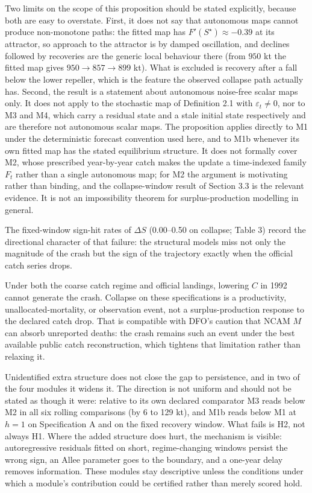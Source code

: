\documentclass[11pt]{article}
\begin{document}
Two limits on the scope of this proposition should be stated
explicitly, because both are easy to overstate. First, it does not say
that autonomous maps cannot produce non-monotone paths: the fitted map
has \(F'(S^\star) \approx -0.39\) at its attractor, so approach to the
attractor is by damped oscillation, and declines followed by recoveries
are the generic local behaviour there (from \(950\) kt the fitted map
gives \(950 \to 857 \to 899\) kt). What is excluded is recovery after a
fall below the lower repeller, which is the feature the observed
collapse path actually has. Second, the result is a statement about
autonomous noise-free scalar maps only. It does not apply to the
stochastic map of Definition 2.1 with \(\varepsilon_t \neq 0\), nor to
M3 and M4, which carry a residual state and a stale initial state
respectively and are therefore not autonomous scalar maps. The
proposition applies directly to M1 under the deterministic forecast
convention used here, and to M1b whenever its own fitted map has the
stated equilibrium structure. It does not formally cover M2, whose
prescribed year-by-year catch makes the update a time-indexed family
\(F_t\) rather than a single autonomous map; for M2 the argument is
motivating rather than binding, and the collapse-window result of
Section 3.3 is the relevant evidence. It is not an impossibility
theorem for surplus-production modelling in general.

The fixed-window sign-hit rates of \(\Delta S\) (0.00--0.50 on collapse;
Table 3) record the directional character of that failure: the
structural models miss not only the magnitude of the crash but the sign
of the trajectory exactly when the official catch series drops.

Under both the coarse catch regime and official landings, lowering \(C\)
in 1992 cannot generate the crash. Collapse on these specifications is a
productivity, unallocated-mortality, or observation event, not a
surplus-production response to the declared catch drop. That is
compatible with DFO's caution that NCAM \(M\) can absorb unreported
deaths: the crash remains such an event under the best available public
catch reconstruction, which tightens that limitation rather than
relaxing it.

Unidentified extra structure does not close the gap to persistence, and
in two of the four modules it widens it. The direction is not uniform
and should not be stated as though it were: relative to its own declared
comparator M3 reads below M2 in all six rolling comparisons (by 6 to 129
kt), and M1b reads below M1 at \(h=1\) on Specification A and on the
fixed recovery window. What fails is H2, not always H1. Where the added
structure does hurt, the mechanism is visible: autoregressive residuals
fitted on short, regime-changing windows persist the wrong sign, an
Allee parameter goes to the boundary, and a one-year delay removes
information. These modules stay descriptive unless the conditions under
which a module's contribution could be certified rather than merely
scored hold.
\end{document}
